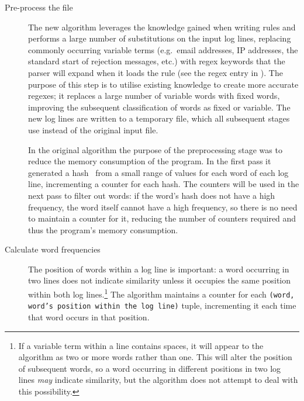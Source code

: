 \begin{description}

    \item [Pre-process the file]  The new algorithm leverages the knowledge
        gained when writing rules and performs a large number of
        substitutions on the input log lines, replacing commonly occurring
        variable terms (e.g.\ email addresses, \gls{IP} addresses, the
        standard start of rejection messages, etc.) with regex keywords
        that the parser will expand when it loads the rule (see the
        regex entry in ).  The purpose of
        this step is to utilise existing knowledge to create more accurate
        regexes; it replaces a large number of variable words with fixed
        words, improving the subsequent classification of words as fixed or
        variable.  The new log lines are written to a temporary file, which
        all subsequent stages use instead of the original input file.

        In the original algorithm the purpose of the preprocessing stage
        was to reduce the memory consumption of the program.  In the first
        pass it generated a hash~\cite{hash-functions} from a small range
        of values for each word of each log line, incrementing a counter
        for each hash.  The counters will be used in the next pass to
        filter out words: if the word's hash does not have a high
        frequency, the word itself cannot have a high frequency, so there
        is no need to maintain a counter for it, reducing the number of
        counters required and thus the program's memory consumption.

    \item [Calculate word frequencies]  The position of words within a log
        line is important: a word occurring in two lines does not indicate
        similarity unless it occupies the same position within both log
        lines.\footnote{If a variable term within a line contains spaces,
        it will appear to the algorithm as two or more words rather than
        one.  This will alter the position of subsequent words, so a word
        occurring in different positions in two log lines \textit{may\/}
        indicate similarity, but the algorithm does not attempt to deal
        with this possibility.}  The algorithm maintains a counter for each
        \texttt{(word, word's position within the log line)} tuple,
        incrementing it each time that word occurs in that position.


\end{description}
